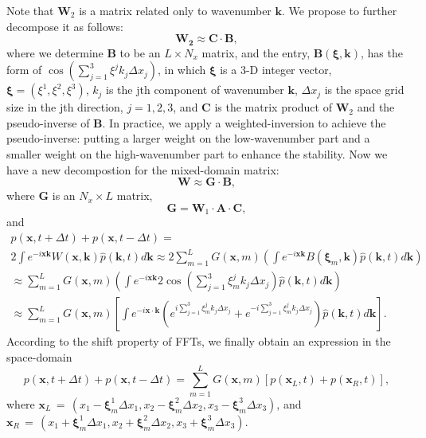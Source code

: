Note that $\mathbf{W}_2$ is a matrix related only to wavenumber $\mathbf{k}$. 
We propose to further decompose it as follows:
\begin{equation}
  \label{eq:w2}
  \mathbf{W_2} \approx \mathbf{C} \cdot \mathbf{B}, 
\end{equation}
where we determine $\mathbf{B}$ to be an $L\times N_x$ matrix, and the entry, $\mathbf{B}(\mathbf{\xi},\mathbf{k})$, has the form of $\cos(\sum\limits_{j=1}^3{\xi^j k_j\Delta x_j})$,
in which $\mathbf{\xi}$ is a 3-D integer vector, $\mathbf{\xi}=(\xi^1,\xi^2,\xi^3)$, $k_j$ is the jth component of wavenumber $\mathbf{k}$, $\Delta x_j$ is the space grid size in the jth direction, $j=1,2,3$, 
and $\mathbf{C}$ is the matrix product of $\mathbf{W}_2$ and the pseudo-inverse of $\mathbf{B}$.
In practice, we apply a weighted-inversion to achieve the pseudo-inverse:
putting a larger weight on the low-wavenumber part and a smaller weight on the high-wavenumber part to enhance the stability.
Now we have a new decompostion for the mixed-domain matrix: 
\begin{equation}
  \label{eq:dematrix}
  \mathbf{W} \approx \mathbf{G} \cdot \mathbf{B},
\end{equation} 
where $\mathbf{G}$ is an $N_x\times L$ matrix, 
\begin{equation}
  \label{eq:Gmatrix}
  \mathbf{G} = \mathbf{W}_1 \cdot \mathbf{A} \cdot \mathbf{C},
\end{equation} 
and
\begin{eqnarray}
\nonumber
  p(\mathbf{x},t+\Delta t) + p(\mathbf{x},t-\Delta t) = \\
\nonumber
2 \int e^{-i \mathbf{x} \mathbf{k}} W(\mathbf{x},\mathbf{k})
\hat{p}(\mathbf{k},t) d \mathbf{k} \approx 2 \sum\limits_{m=1}^L
G(\mathbf{x},m)  \left(\int e^{-i \mathbf{x}\mathbf{k}}
  B(\mathbf{\xi}_m,\mathbf{k}) \hat{p}(\mathbf{k},t) d\mathbf{k}
\right)\\
\nonumber
 \approx  \sum\limits_{m=1}^L G(\mathbf{x},m)  \left(\int e^{-i
     \mathbf{x}\mathbf{k}} 2\cos(\sum\limits_{j=1}^3{\xi_m^j k_j\Delta
     x_j}) \hat{p}(\mathbf{k},t) d\mathbf{k} \right) \\
\approx  \sum\limits_{m=1}^L G(\mathbf{x},m)  \left[\int e^{-i \mathbf{x} \cdot \mathbf{k}} (e^{i \sum\limits_{j=1}^3{\xi_m^j k_j\Delta x_j}} + e^{-i \sum\limits_{j=1}^3{\xi_m^j k_j\Delta x_j}})\hat{p}(\mathbf{k},t) d\mathbf{k} \right].
\label{eq:la}
\end{eqnarray}
According to the shift property of FFTs, we finally obtain an expression in the space-domain 
\begin{equation}
  \label{eq:stencil}
  p(\mathbf{x},t+\Delta t) + p(\mathbf{x},t-\Delta t) = \sum\limits_{m=1}^L G(\mathbf{x},m) [p(\mathbf{x}_L,t)+p(\mathbf{x}_R,t)], 
\end{equation}
where $\mathbf{x}_L\,=\,(x_1-\mathbf{\xi}_m^1\Delta x_1,x_2-\mathbf{\xi}_m^2\Delta x_2,x_3-\mathbf{\xi}_m^3\Delta x_3)$, and 
 $\mathbf{x}_R\,=\,(x_1+\mathbf{\xi}_m^1\Delta x_1,x_2+\mathbf{\xi}_m^2\Delta x_2,x_3+\mathbf{\xi}_m^3\Delta x_3)$.\\

